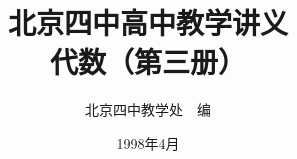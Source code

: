 \documentclass[b5paper, openany]{ctexbook}
\theoremstyle{plain}
\begin{document}
\title{\Huge\bfseries 北京四中高中教学讲义\\代数（第三册）}



\author{\Large 北京四中教学处~~编}
\date{\Large 1998年4月}

\maketitle




\frontmatter


\tableofcontents


\mainmatter

\setcounter{chapter}{7}












\backmatter

% 
\end{document}
